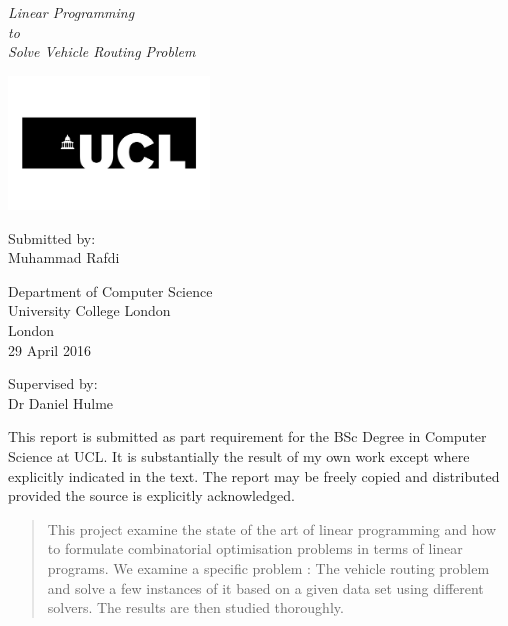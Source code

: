 \documentclass[a4paper, 12pt]{report}
\begin{document}
\begin{titlepage}
    \begin{center}
        \Huge
        \textit{Linear Programming\\to\\Solve Vehicle Routing Problem}

        \vspace{1.5cm}

        \includegraphics[width=0.4\textwidth]{ucl-logo.jpg}
        
        \vspace{1.5cm}
        
        \Large
        Submitted by:\\
        Muhammad Rafdi\\

        \vspace{0.8cm}

        Department of Computer Science\\
        University College London\\
        London\\
        29 April 2016

        \vspace{0.8cm}
        Supervised by:\\
        Dr Daniel Hulme       
        
        \vfill
                
        
        \normalsize   
        This report is submitted as part requirement for the BSc Degree in Computer Science at UCL. It is substantially
         the result of my own work except where explicitly indicated in the text. The report may be freely copied and
          distributed provided the source is explicitly acknowledged.

        
    \end{center}
\end{titlepage}


\begin{abstract}
\centering
   This project examine the state of the art of linear programming and how to formulate combinatorial optimisation
   problems in terms of linear programs. We examine a specific problem : The vehicle routing problem and solve a
   few instances of it based on a given data set using different solvers. The results are then studied thoroughly.
\end{abstract}
\end{document}
